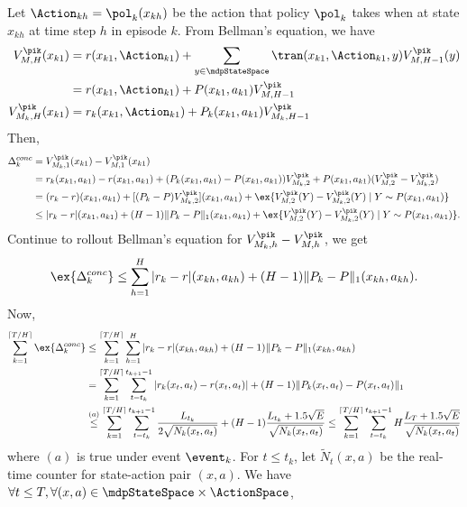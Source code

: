             Let $\Action_{kh}=\pol_{k}(x_{kh})$ be the action that policy $\pol_k$ takes when at state $x_{kh}$ at time step $h$ in episode $k$. From Bellman's equation, we have
            \begin{align*}
                V^{\pik}_{M,H}(x_{k1})
                &= r(x_{k1},\Action_{k1}) +\sum_{y\in\mdpStateSpace}\tran(x_{k1},\Action_{k1},y)V^{\pik}_{M,H-1}(y) \\
                &= r(x_{k1},\Action_{k1}) +P(x_{k1},a_{k1})V^{\pik}_{M,H-1} \\
                V^{\pik}_{M_k,H}(x_{k1}) &= r_k(x_{k1},\Action_{k1}) +P_k(x_{k1},a_{k1})V^{\pik}_{M_k,H-1}
            \end{align*}
            Then,
            \begin{align*}
                \Delta_k^{conc}
                &= V^{\pik}_{M_k,1}(x_{k1}) -V^{\pik}_{M,1}(x_{k1}) \\
                &= r_k(x_{k1},a_{k1})-r(x_{k1},a_{k1}) +(P_k(x_{k1},a_{k1}) -P(x_{k1},a_{k1}))V^{\pik}_{M_k,2} +P(x_{k1},a_{k1})(V^{\pik}_{M,2}-V^{\pik}_{M_k,2}) \\
                &= (r_k-r)(x_{k1},a_{k1}) +[(P_k -P)V^{\pik}_{M_k,2}](x_{k1},a_{k1}) +\ex{V^{\pik}_{M,2}(Y)-V^{\pik}_{M_k,2}(Y) \mid Y\sim P(x_{k1},a_{k1})} \\
                &\le \vert r_k-r\vert(x_{k1},a_{k1}) +(H-1)\Vert P_k -P\Vert_1(x_{k1},a_{k1}) +\ex{V^{\pik}_{M,2}(Y)-V^{\pik}_{M_k,2}(Y) \mid Y\sim P(x_{k1},a_{k1})}.
            \end{align*}
            Continue to rollout Bellman's equation for $V^{\pik}_{M_k,h}-V^{\pik}_{M,h}$, we get
            \begin{align*}
                \ex{\Delta_k^{conc}} \le \sum_{h=1}^{H}\vert r_k-r\vert(x_{kh},a_{kh}) +(H-1)\Vert P_k -P\Vert_1(x_{kh},a_{kh}).
            \end{align*}
            Now,
            \begin{align*}
                \sum_{k=1}^{\lceil T/H\rceil}\ex{\Delta_k^{conc}}
                &\le \sum_{k=1}^{\lceil T/H\rceil} \sum_{h=1}^{H}\vert r_k-r\vert(x_{kh},a_{kh}) +(H-1)\Vert P_k -P\Vert_1(x_{kh},a_{kh}) \\
                &=\sum_{k=1}^{\lceil T/H\rceil} \sum_{t=t_k}^{t_{k+1}-1}\vert r_k(x_t,a_t)-r(x_t,a_t)\vert +(H-1)\Vert P_k(x_t,a_t) -P(x_t,a_t)\Vert_1 \\
                &\overset{(a)}\le \sum_{k=1}^{\lceil T/H\rceil} \sum_{t=t_k}^{t_{k+1}-1} \frac{L_{t_k}}{2\sqrt{N_k(x_t,a_t)}} +(H-1)\frac{L_{t_k}+1.5\sqrt{E}}{\sqrt{N_k(x_t,a_t)}} \le\sum_{k=1}^{\lceil T/H\rceil} \sum_{t=t_k}^{t_{k+1}-1}H\frac{L_T+1.5\sqrt{E}}{\sqrt{N_k(x_t,a_t)}}
            \end{align*}
            where $(a)$ is true under event $\event_k$.
            For $t\le t_k$, let $\tilde{N}_t(x,a)$ be the real-time counter for state-action pair $(x,a)$. We have $\forall t\le T, \forall (x,a)\in \mdpStateSpace\times\ActionSpace$,
            
